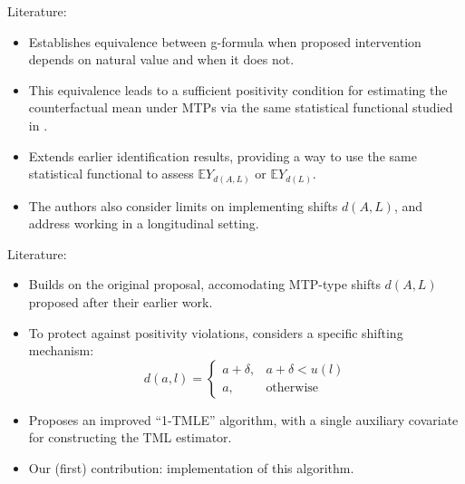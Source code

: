 \documentclass{beamer}
\newcommand{\E}{\mathbb{E}}
\begin{document}

\begin{frame}[c]{Literature: \cite{young2014identification}}

\begin{center}
\begin{itemize}
  \itemsep10pt
  \item Establishes equivalence between g-formula when proposed intervention
    depends on natural value and when it does not.
  \item This equivalence leads to a sufficient positivity condition for
    estimating the counterfactual mean under MTPs via the same statistical
    functional studied in \cite{diaz2012population}.
  \item Extends earlier identification results, providing a way to use the same
    statistical functional to assess $\E Y_{d(A,L)}$ or $\E Y_{d(L)}$.
  \item The authors also consider limits on implementing shifts $d(A,L)$, and
    address working in a longitudinal setting.
\end{itemize}
\end{center}

\note{
}

\end{frame}


\begin{frame}[c]{Literature: \cite{diaz2018stochastic}}

\begin{center}
\begin{itemize}
  \itemsep10pt
  \item Builds on the original proposal, accomodating MTP-type shifts $d(A,L)$
    proposed after their earlier work.
  \item To protect against positivity violations, considers a specific shifting
    mechanism:
     \begin{equation*}\label{shift_intervention}
       d(a, l) =
         \begin{cases}
           a + \delta, & a + \delta < u(l) \\
           a, & \text{otherwise}
         \end{cases}
     \end{equation*}
  \item Proposes an improved ``1-TMLE'' algorithm, with a single auxiliary
    covariate for constructing the TML estimator.
  \item Our (first) contribution: implementation of this algorithm.
\end{itemize}
\end{center}

\note{
}

\end{frame}
\end{document}
